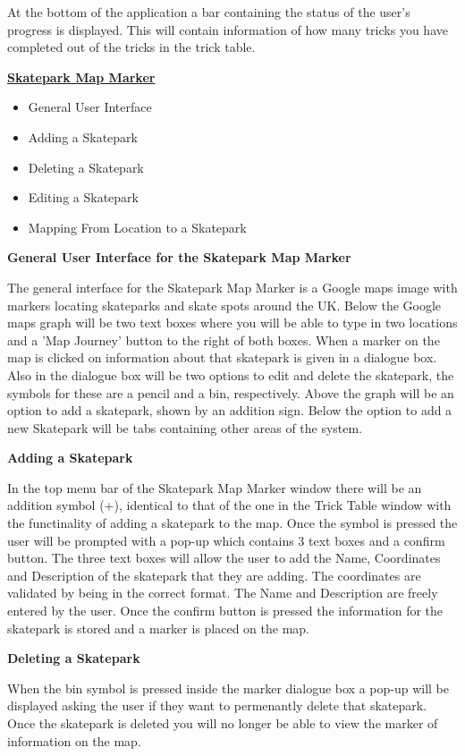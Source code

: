 At the bottom of the application a bar containing the status of the user's progress is displayed. This will contain information of how many tricks you have completed out of the tricks in the trick table.






\underline{\textbf{Skatepark Map Marker}}
\begin{itemize}
\item General User Interface
\item Adding a Skatepark
\item Deleting a Skatepark
\item Editing a Skatepark 
\item Mapping From Location to a Skatepark
\end{itemize}

\textbf{General User Interface for the Skatepark Map Marker}

The general interface for the Skatepark Map Marker is a Google maps image with markers locating skateparks and skate spots around the UK. Below the Google maps graph will be two text boxes where you will be able to type in two locations and a 'Map Journey' button to the right of both boxes. When a marker on the map is clicked on information about that skatepark is given in a dialogue box. Also in the dialogue box will be two options to edit and delete the skatepark, the symbols for these are a pencil and a bin, respectively. Above the graph will be an option to add a skatepark, shown by an addition sign. Below the option to add a new Skatepark will be tabs containing other areas of the system.

\textbf{Adding a Skatepark}

In the top menu bar of the Skatepark Map Marker window there will be an addition symbol (+), identical to that of the one in the Trick Table window with the functinality of adding a skatepark to the map. Once the symbol is pressed the user will be prompted with a pop-up which contains 3 text boxes and a confirm button. The three text boxes will allow the user to add the Name, Coordinates and Description of the skatepark that they are adding. The coordinates are validated by being in the correct format. The Name and Description are freely entered by the user. Once the confirm button is pressed the information for the skatepark is stored and a marker is placed on the map.

\textbf{Deleting a Skatepark}

When the bin symbol is pressed inside the marker dialogue box a pop-up will be displayed asking the user if they want to permenantly delete that skatepark. Once the skatepark is deleted you will no longer be able to view the marker of information on the map. 

